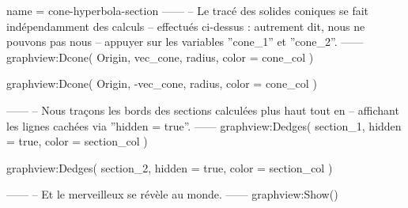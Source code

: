 \documentclass{standalone}
\begin{document}
\begin{luadraw}{name = cone-hyperbola-section}
------
-- Le tracé des solides coniques se fait indépendamment des calculs
-- effectués ci-dessus : autrement dit, nous ne pouvons pas nous
-- appuyer sur les variables ''cone_1'' et ''cone_2''.
------
graphview:Dcone(
  Origin, vec_cone, radius,
  {
    color = cone_col
  })

graphview:Dcone(
  Origin, -vec_cone, radius,
  {
    color = cone_col
  })

------
-- Nous traçons les bords des sections calculées plus haut tout en
-- affichant les lignes cachées via ''hidden = true''.
------
graphview:Dedges(
  section_1,
  {
    hidden = true,
    color = section_col
  })

graphview:Dedges(
  section_2,
  {
    hidden = true,
    color = section_col
  })

------
-- Et le merveilleux se révèle au monde.
------
graphview:Show()
\end{luadraw}
\end{document}
